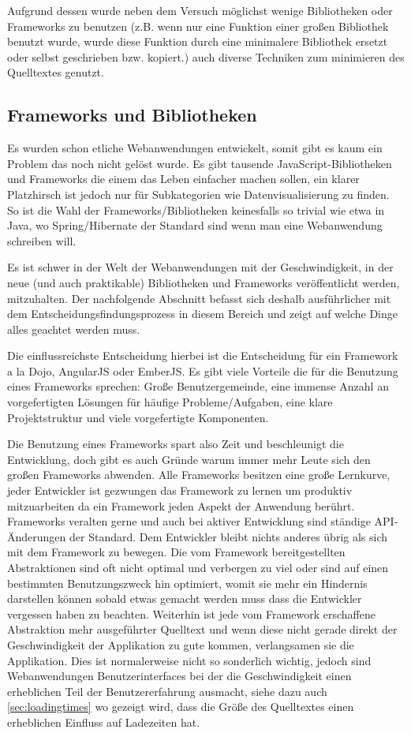 \documentclass[12pt,twoside]{book}
\begin{document}
Aufgrund dessen wurde neben dem Versuch möglichst wenige Bibliotheken oder Frameworks zu benutzen (z.B. wenn nur eine Funktion einer großen Bibliothek benutzt wurde, wurde diese Funktion durch eine minimalere Bibliothek ersetzt oder selbst geschrieben bzw. kopiert.) auch diverse Techniken zum minimieren des Quelltextes genutzt.

\subsection{Frameworks und Bibliotheken}

Es wurden schon etliche Webanwendungen entwickelt, somit gibt es kaum ein Problem das noch nicht gelöst wurde. Es gibt tausende JavaScript-Bibliotheken und Frameworks die einem das Leben einfacher machen sollen, ein klarer Platzhirsch ist jedoch nur für Subkategorien wie Datenvisualisierung zu finden. So ist die Wahl der Frameworks/Bibliotheken keinesfalls so trivial wie etwa in Java, wo Spring/Hibernate der Standard sind wenn man eine Webanwendung schreiben will.

Es ist schwer in der Welt der Webanwendungen mit der Geschwindigkeit, in der neue (und auch praktikable) Bibliotheken und Frameworks veröffentlicht werden, mitzuhalten. Der nachfolgende Abschnitt befasst sich deshalb ausführlicher mit dem Entscheidungsfindungsprozess in diesem Bereich und zeigt auf welche Dinge alles geachtet werden muss.

Die einflussreichste Entscheidung hierbei ist die Entscheidung für ein Framework a la Dojo\cite{dojo}, AngularJS\cite{angularjs} oder EmberJS\cite{emberjs}.
Es gibt viele Vorteile die für die Benutzung eines Frameworks sprechen: Große Benutzergemeinde, eine immense Anzahl an vorgefertigten Lösungen für häufige Probleme/Aufgaben, eine klare Projektstruktur und viele vorgefertigte Komponenten.

Die Benutzung eines Frameworks spart also Zeit und beschleunigt die Entwicklung, doch gibt es auch Gründe warum immer mehr Leute sich den großen Frameworks abwenden.
Alle Frameworks besitzen eine große Lernkurve, jeder Entwickler ist gezwungen das Framework zu lernen um produktiv mitzuarbeiten da ein Framework jeden Aspekt der Anwendung berührt. Frameworks veralten gerne und auch bei aktiver Entwicklung sind ständige API-Änderungen der Standard. Dem Entwickler bleibt nichts anderes übrig als sich mit dem Framework zu bewegen. Die vom Framework bereitgestellten Abstraktionen sind oft nicht optimal und verbergen zu viel oder sind auf einen bestimmten Benutzungszweck hin optimiert, womit sie mehr ein Hindernis darstellen können sobald etwas gemacht werden muss dass die Entwickler vergessen haben zu beachten.
Weiterhin ist jede vom Framework erschaffene Abstraktion mehr ausgeführter Quelltext und wenn diese nicht gerade direkt der Geschwindigkeit der Applikation zu gute kommen, verlangsamen sie die Applikation. Dies ist normalerweise nicht so sonderlich wichtig, jedoch sind Webanwendungen Benutzerinterfaces bei der die Geschwindigkeit einen erheblichen Teil der Benutzererfahrung ausmacht, siehe dazu auch \ref{sec:loadingtimes} wo gezeigt wird, dass die Größe des Quelltextes einen erheblichen Einfluss auf Ladezeiten hat.
\end{document}
